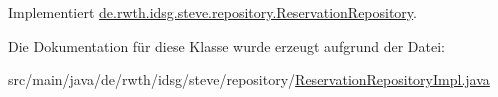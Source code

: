 Implementiert \hyperlink{interfacede_1_1rwth_1_1idsg_1_1steve_1_1repository_1_1_reservation_repository_a0e4c6205a4b4e61d9076401a36483d4e}{de.\-rwth.\-idsg.\-steve.\-repository.\-Reservation\-Repository}.



Die Dokumentation für diese Klasse wurde erzeugt aufgrund der Datei\-:\begin{DoxyCompactItemize}
\item 
src/main/java/de/rwth/idsg/steve/repository/\hyperlink{_reservation_repository_impl_8java}{Reservation\-Repository\-Impl.\-java}\end{DoxyCompactItemize}
